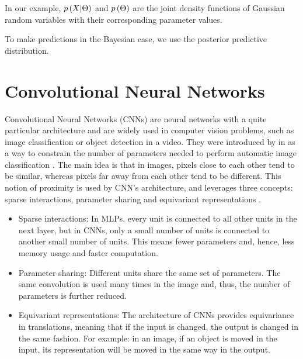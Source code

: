 In our example, $p\left( X | \Theta \right)$ and $p\left( \Theta \right)$ are the joint density functions of Gaussian random variables with their corresponding parameter values.

To make predictions in the Bayesian case, we use the posterior predictive distribution.



\section{Convolutional Neural Networks}

Convolutional Neural Networks (CNNs) are neural networks with a quite particular architecture and are widely used in computer vision problems, such as image classification or object detection in a video. They were introduced by \citeauthor{lecun1989generalization} in \citeyear{lecun1989generalization} as a way to constrain the number of parameters needed to perform automatic image classification \cite{lecun1989generalization}. The main idea is that in images, pixels close to each other tend to be similar, whereas pixels far away from each other tend to be different. This notion of proximity is used by CNN's architecture, and leverages three concepts: sparse interactions, parameter sharing and equivariant representations \cite[p.~335]{bengio2015deep}.

\begin{itemize}
  \item Sparse interactions: In MLPs, every unit is connected to all other units in the next layer, but in CNNs, only a small number of units is connected to another small number of units. This means fewer parameters and, hence, less memory usage and faster computation.
  \item Parameter sharing: Different units share the same set of parameters. The same convolution is used many times in the image and, thus, the number of parameters is further reduced.
  \item Equivariant representations: The architecture of CNNs provides equivariance in translations, meaning that if the input is changed, the output is changed in the same fashion. For example: in an image, if an object is moved in the input, its representation will be moved in the same way in the output.
\end{itemize}

